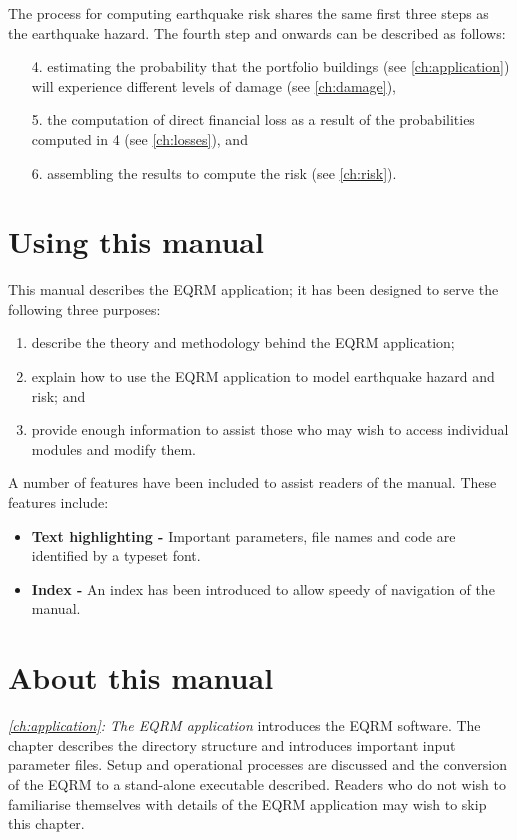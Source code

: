 The process for computing earthquake risk shares the same first
three steps as the earthquake hazard. The fourth step and onwards
can be described as follows:
\begin{enumerate}
\item[4.] estimating the probability that the portfolio buildings
(see \cref{ch:application}) will experience different levels of damage
(see \cref{ch:damage}), \item[5.] the computation of direct
financial loss as a result of the probabilities computed in 4 (see
\cref{ch:losses}), and \item[6.] assembling the results to compute
the risk (see \cref{ch:risk}).
\end{enumerate}

\section{Using this manual}

This manual describes the EQRM application; it has been designed
to serve the following three purposes:
\begin{enumerate}
\item describe the theory and methodology behind the EQRM
application; \item explain how to use the EQRM application to
model earthquake hazard and risk; and \item provide enough
information to assist those who may wish to access individual
modules and modify them.
\end{enumerate}

A number of features have been included to assist readers of the
manual. These features include:
\begin{itemize}
\item \textbf{Text highlighting -} Important parameters, file
names and code are identified by a typeset font. \item
\textbf{Index -} An index has been introduced to allow speedy of
navigation of the manual.

\end{itemize}


\section{About this manual}

\textit{\cref{ch:application}: The EQRM application} introduces
the EQRM software. The chapter describes the directory structure
and introduces important input parameter files. Setup and
operational processes are discussed and the conversion of the EQRM
to a stand-alone executable described. Readers who do not wish to
familiarise themselves with details of the EQRM application may
wish to skip this chapter.

